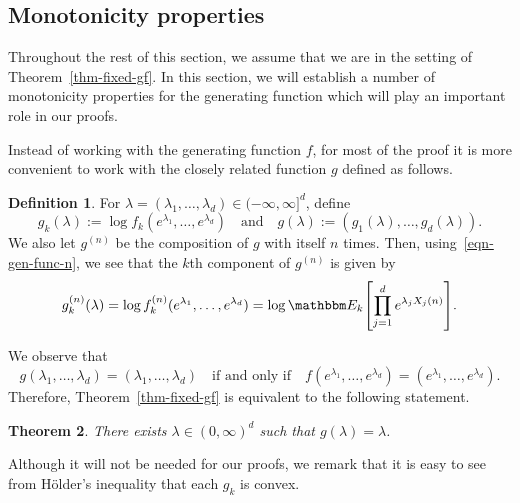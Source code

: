 \documentclass[11pt]{article}
\theoremstyle{plain}
\newtheorem{thm}{Theorem}[section]
\theoremstyle{definition}
\newtheorem{defn}[thm]{Definition}
\numberwithin{equation}{section}
\newcommand{\eqb}{\begin{equation}}
\newcommand{\eqe}{\end{equation}}
\newcommand{\eqbn}{\begin{equation*}}
\newcommand{\eqen}{\end{equation*}}
\newcommand{\BB}{\mathbbm}
\let\originalleft\left
\let\originalright\right
\renewcommand{\left}{\mathopen{}\mathclose\bgroup\originalleft}
\renewcommand{\right}{\aftergroup\egroup\originalright}
\begin{document}
 



 

 

\subsection{Monotonicity properties}
\label{sec-mono}

Throughout the rest of this section, we assume that we are in the setting of Theorem~\ref{thm-fixed-gf}. 
In this section, we will establish a number of monotonicity properties for the generating function which will play an important role in our proofs. 
 
Instead of working with the generating function $f$, for most of the proof it is more convenient to work with the closely related function $g$ defined as follows. 

\begin{defn} \label{def-log-gf}
For $\lambda = (\lambda_1,\dots,\lambda_d ) \in (-\infty,\infty]^d$, define 
\eqbn
g_k(\lambda) := \log f_k(e^{\lambda_1} , \dots, e^{\lambda_d} ) \quad \text{and} \quad 
g(\lambda) := (g_1(\lambda),\dots,g_d(\lambda)) .
\eqen
We also let $g^{(n)}$ be the composition of $g$ with itself $n$ times. 
Then, using~\eqref{eqn-gen-func-n}, we see that the $k$th component of $g^{(n)}$ is given by
\eqb \label{eqn-convex-func-n} 
g_k^{(n)}(\lambda) 
= \log f_k^{(n)}(e^{\lambda_1},\dots,e^{\lambda_d})
= \log \BB E_k\left[ \prod_{j=1}^d e^{\lambda_j X_j(n)} \right] .
\eqe 
\end{defn}

We observe that 
\eqb \label{eqn-fixed-pt-equiv}
g(\lambda_1,\dots,\lambda_d) = (\lambda_1,\dots,\lambda_d) \quad \text{if and only if} \quad
f(e^{\lambda_1},\dots,e^{\lambda_d}) = (e^{\lambda_1},\dots, e^{\lambda_d}) .
\eqe
Therefore, Theorem~\ref{thm-fixed-gf} is equivalent to the following statement.

\begin{thm} \label{thm-fixed}
There exists $\lambda \in (0,\infty)^d $ such that $g(\lambda) = \lambda$.
\end{thm}

Although it will not be needed for our proofs, we remark that it is easy to see from H\"older's inequality that each $g_k$ is convex. 
\end{document}
